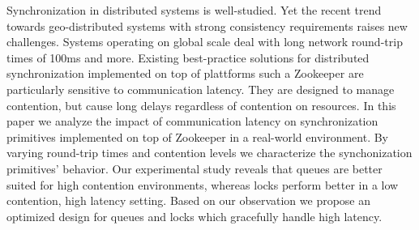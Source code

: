 Synchronization in distributed systems is well-studied. Yet the recent trend towards geo-distributed systems with strong consistency requirements raises new challenges. Systems operating on global scale deal with long network round-trip times of 100ms and more. Existing best-practice solutions for distributed synchronization implemented on top of plattforms such a Zookeeper are particularly sensitive to communication latency. They are designed to manage contention, but cause long delays regardless of contention on resources. In this paper we analyze the impact of communication latency on synchronization primitives implemented on top of Zookeeper in a real-world environment. By varying round-trip times and contention levels we characterize the synchonization primitives' behavior. Our experimental study reveals that queues are better suited for high contention environments, whereas locks perform better in a low contention, high latency setting. Based on our observation we propose an optimized design for queues and locks which gracefully handle high latency.
